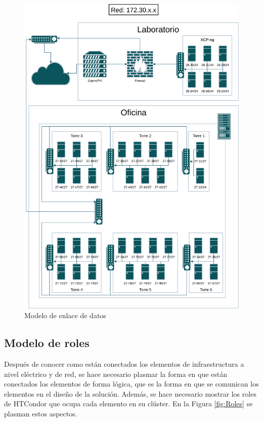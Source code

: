\begin{figure}[H]
	\centering
	\includegraphics[scale=0.1]{tablas-images/personalizado/Diagramas HTCondor-Enlace.drawio.png}
	\caption{Modelo de enlace de datos}
    \label{fig:Enlace}
\end{figure}

\subsection{Modelo de roles}
\noindent
Después de conocer como están conectados los elementos de infraestructura a nivel eléctrico y de red, se hace necesario plasmar la forma en que están conectados los elementos de forma lógica, que es la forma en que se comunican los elementos en el diseño de la solución. Además, se hace necesario mostrar los roles de HTCondor que ocupa cada elemento en su clúster. En la Figura \ref{fig:Roles} se plasman estos aspectos.

